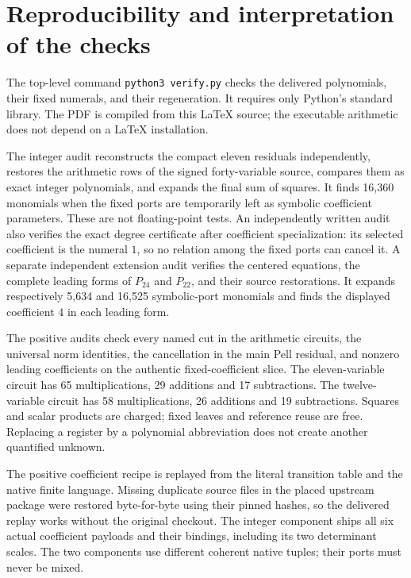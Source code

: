 \documentclass[11pt]{article}
\theoremstyle{remark}\newtheorem{remark}[theorem]{Remark}
\begin{document}
\section{Reproducibility and interpretation of the checks}

The top-level command \texttt{python3 verify.py} checks the delivered
polynomials, their fixed numerals, and their regeneration. It requires only
Python's standard library. The PDF is compiled from this \LaTeX{} source;
the executable arithmetic does not depend on a \LaTeX{} installation.

The integer audit reconstructs the compact eleven residuals independently,
restores the arithmetic rows of the signed forty-variable source, compares
them as exact integer polynomials, and expands the final sum of squares.
It finds 16,360 monomials when the fixed ports are temporarily left as
symbolic coefficient parameters. These are not floating-point tests.
An independently written audit also verifies the exact degree certificate
after coefficient specialization: its selected coefficient is the numeral
$1$, so no relation among the fixed ports can cancel it. A separate
independent extension audit verifies the centered equations, the complete
leading forms of $P_{24}$ and $P_{22}$, and their source restorations.
It expands respectively 5,634 and 16,525 symbolic-port monomials and finds
the displayed coefficient $4$ in each leading form.

The positive audits check every named cut in the arithmetic circuits,
the universal norm identities, the cancellation in the main Pell residual,
and nonzero leading coefficients on the authentic fixed-coefficient slice.
The eleven-variable circuit has 65 multiplications, 29 additions and
17 subtractions. The twelve-variable circuit has 58 multiplications,
26 additions and 19 subtractions. Squares and scalar products are charged;
fixed leaves and reference reuse are free. Replacing a register by a
polynomial abbreviation does not create another quantified unknown.

The positive coefficient recipe is replayed from the literal transition
table and the native finite language. Missing duplicate source files in
the placed upstream package were restored byte-for-byte using their pinned
hashes, so the delivered replay works without the original checkout.
The integer component ships all six actual coefficient payloads and their
bindings, including its two determinant scales. The two components use
different coherent native tuples; their ports must never be mixed.
\end{document}
